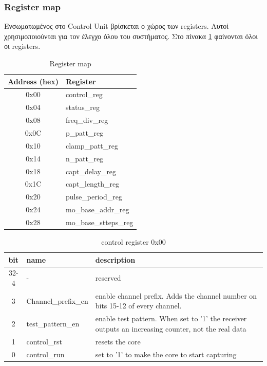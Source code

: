 \documentclass[12pt,a4paper]{book}
\begin{document}
\subsubsection{Register map}
Ενσωματωμένος στο Control Unit βρίσκεται ο χώρος των registers. Αυτοί χρησιμοποιούνται για τον έλεγχο όλου του συστήματος. Στο πίνακα \ref{Registers} φαίνονται όλοι οι registers.
\begin{table}
\center
\begin{tabular}{|c|l|}
\hline 
Address (hex) & Register \\
\hline 
\hline 
0x00 & control\_reg \\
\hline 
0x04 & status\_reg \\
\hline 
0x08 & freq\_div\_reg \\
\hline 
0x0C & p\_patt\_reg \\
\hline 
0x10 & clamp\_patt\_reg \\
\hline 
0x14 & n\_patt\_reg \\
\hline 
0x18 & capt\_delay\_reg \\
\hline 
0x1C & capt\_length\_reg \\
\hline 
0x20 & pulse\_period\_reg \\
\hline 
0x24 & mo\_base\_addr\_reg \\
\hline 
0x28 & mo\_base\_stteps\_reg \\
\hline
\end{tabular} 
\caption{Register map}
\label{Registers} 
\end{table} 



\begin{table}
\begin{tabularx}{\linewidth}{|c|l|X|}
\hline 
bit & name & description \\
\hline
\hline
32-4 & - & reserved \\
\hline
3 & Channel\_prefix\_en & enable channel prefix. Adds the channel number on bits 15-12 of every channel.  \\
\hline
2 &  test\_pattern\_en & enable test pattern. When set to '1' the receiver outputs an increasing counter, not the real data  \\
\hline
1 & control\_rst & resets the core \\
\hline
0 & control\_run & set to '1' to make the core to start capturing \\
\hline
\end{tabularx} 
\caption{control register 0x00}
\label{control_reg} 
\end{table} 
\end{document}
